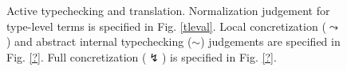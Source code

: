 \documentclass[9pt,preprint]{sigplanconf}
\begin{document}
\begin{figure}[t]
\begin{mathpar}
\end{mathpar}
\caption{\small Active typechecking and translation. Normalization judgement for type-level terms is specified in Fig. \ref{tleval}. Local concretization ($\leadsto$)  and abstract internal typechecking ($\sim$) judgements are specified in Fig. \ref{?}. Full concretization ($\lightning$) is specified in Fig. \ref{?}.}
\label{att}
\vspace{-10pt}
\end{figure}
\end{document}
